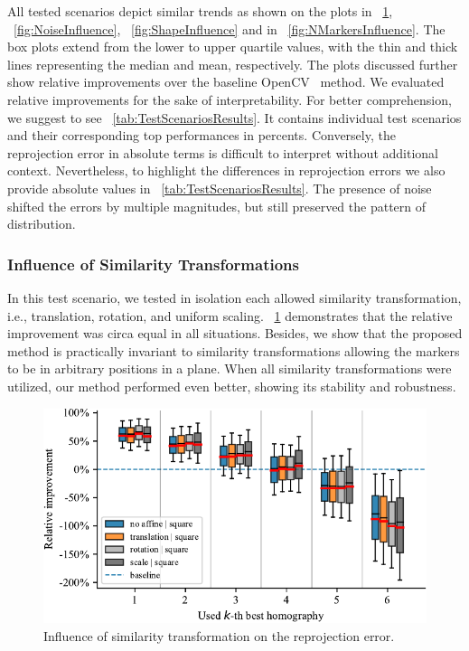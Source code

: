 All tested scenarios depict similar trends as shown on the plots in \figstr{}~\ref{fig:SimilarityTransformInfluence}, \figstr{}~\ref{fig:NoiseInfluence}, \figstr{}~\ref{fig:ShapeInfluence} and in \figstr{}~\ref{fig:NMarkersInfluence}. The box plots extend from the lower to upper quartile values, with the thin and thick lines representing the median and mean, respectively. The plots discussed further show relative improvements over the baseline OpenCV~\cite{bradski2008learning} method. We evaluated relative improvements for the sake of interpretability. For better comprehension, we suggest to see \tablestr{}~\ref{tab:TestScenariosResults}. It contains individual test scenarios and their corresponding top performances in percents. Conversely, the reprojection error in absolute terms is difficult to interpret without additional context. Nevertheless, to highlight the differences in reprojection errors we also provide absolute values in \tablestr{}~\ref{tab:TestScenariosResults}. The presence of noise shifted the errors by multiple magnitudes, but still preserved the pattern of distribution.

\subsubsection{Influence of Similarity Transformations}

In this test scenario, we tested in isolation each allowed similarity transformation, i.e., translation, rotation, and uniform scaling. \figstr{}~\ref{fig:SimilarityTransformInfluence} demonstrates that the relative improvement was circa equal in all situations. Besides, we show that the proposed method is practically invariant to similarity transformations allowing the markers to be in arbitrary positions in a plane. When all similarity transformations were utilized, our method performed even better, showing its stability and robustness.

\def\boxplotimgwidth{0.75\linewidth}

\begin{figure}[t]
    \centering
    \includegraphics[width=\boxplotimgwidth]{figures/homography/similarity_transform_influence.pdf}
    \caption[Influence of similarity transformation]{Influence of similarity transformation on the reprojection error.}
    \label{fig:SimilarityTransformInfluence}
\end{figure}


